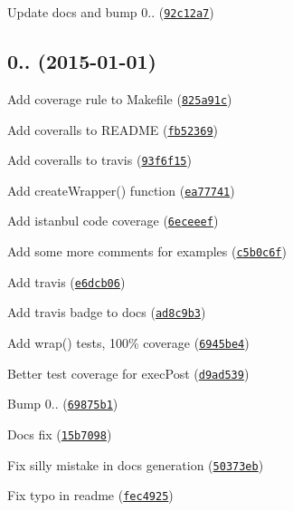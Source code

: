 \begin{DoxyItemize}
\item Update docs and bump 0.. (\href{https://github.com/vkarpov15/kareem/commit/92c12a7}{\tt 92c12a7})
\end{DoxyItemize}

\label{_0.0.5}%
 \subsection*{
\footnotesize 0.. (2015-\/01-\/01)
\normalsize }


\begin{DoxyItemize}
\item Add coverage rule to Makefile (\href{https://github.com/vkarpov15/kareem/commit/825a91c}{\tt 825a91c})
\item Add coveralls to R\+E\+A\+D\+ME (\href{https://github.com/vkarpov15/kareem/commit/fb52369}{\tt fb52369})
\item Add coveralls to travis (\href{https://github.com/vkarpov15/kareem/commit/93f6f15}{\tt 93f6f15})
\item Add create\+Wrapper() function (\href{https://github.com/vkarpov15/kareem/commit/ea77741}{\tt ea77741})
\item Add istanbul code coverage (\href{https://github.com/vkarpov15/kareem/commit/6eceeef}{\tt 6eceeef})
\item Add some more comments for examples (\href{https://github.com/vkarpov15/kareem/commit/c5b0c6f}{\tt c5b0c6f})
\item Add travis (\href{https://github.com/vkarpov15/kareem/commit/e6dcb06}{\tt e6dcb06})
\item Add travis badge to docs (\href{https://github.com/vkarpov15/kareem/commit/ad8c9b3}{\tt ad8c9b3})
\item Add wrap() tests, 100\% coverage (\href{https://github.com/vkarpov15/kareem/commit/6945be4}{\tt 6945be4})
\item Better test coverage for exec\+Post (\href{https://github.com/vkarpov15/kareem/commit/d9ad539}{\tt d9ad539})
\item Bump 0.. (\href{https://github.com/vkarpov15/kareem/commit/69875b1}{\tt 69875b1})
\item Docs fix (\href{https://github.com/vkarpov15/kareem/commit/15b7098}{\tt 15b7098})
\item Fix silly mistake in docs generation (\href{https://github.com/vkarpov15/kareem/commit/50373eb}{\tt 50373eb})
\item Fix typo in readme (\href{https://github.com/vkarpov15/kareem/commit/fec4925}{\tt fec4925})

\end{DoxyItemize}
